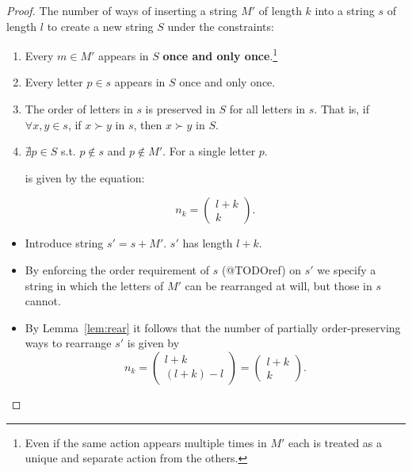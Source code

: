 \documentclass{article}
\newtheorem{proof}{Proof}
\begin{document}
\begin{proof}
The number of ways of inserting a string $M'$ of length $k$ into a string $s$ of length $l$ to create a new string $S$ under the constraints:
\begin{enumerate}
\item Every $m \in M'$ appears in $S$ \textbf{once and only once}.\footnote{Even if the same action appears multiple times in $M'$ each is treated as a unique and separate action from the others.}
\item Every letter $p\in s$ appears in $S$ once and only once.
\item The order of letters in $s$ is preserved in $S$ for all letters in $s$. That is, if $\forall x, y \in s$, if $x \succ y$ in $s$, then $x \succ y$ in $S$.
\item $\nexists p \in S$ s.t. $p \not\in s$ and $p \not\in M'$. For a single letter $p$.

is given by the equation:

\[
n_k =\begin{pmatrix} l + k \\ k \end{pmatrix}.
\]

\end{enumerate}

\begin{itemize}
\item Introduce string $s'=s+M'$. $s'$ has length $l+k$. 
\item By enforcing the order requirement of $s$ (@TODOref) on $s'$ we specify a string in which the letters of $M'$ can be rearranged at will, but those in $s$ cannot.
\item By Lemma~\ref{lem:rear} it follows that the number of partially order-preserving ways to rearrange $s'$ is given by 
\[
n_k = \begin{pmatrix} l + k \\ (l+k)-l \end{pmatrix} = \begin{pmatrix} l + k \\ k \end{pmatrix}.
\]
\end{itemize}
\label{proof:ins}
\end{proof}
\end{document}
